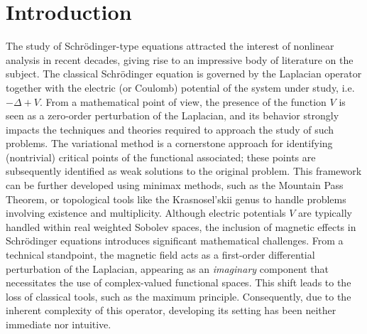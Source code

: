 \documentclass[leqno,11pt]{amsart}
\numberwithin{equation}{section}
\begin{document}
\section{Introduction}
The study of Schr\"odinger-type equations attracted the interest of nonlinear analysis in recent decades, giving rise to an impressive body of literature on the subject. The classical Schr\"odinger equation is governed by the Laplacian operator together with the electric (or Coulomb) potential of the system under study, i.e. $-\Delta + V$. From a mathematical point of view, the presence of the function $V$ is seen as a zero-order perturbation of the Laplacian, and its behavior strongly impacts the techniques and theories required to approach the study of such problems. The variational method is a cornerstone approach for identifying (nontrivial) critical points of the functional associated; these points are subsequently identified as weak solutions to the original problem. This framework can be further developed using minimax methods, such as the Mountain Pass Theorem, or topological tools like the Krasnosel’skii genus to handle problems involving existence and multiplicity. 
Although electric potentials $V$ are typically handled within real weighted Sobolev spaces, the inclusion of magnetic effects in Schr\"odinger equations introduces significant mathematical challenges. From a technical standpoint, the magnetic field acts as a first-order differential perturbation of the Laplacian, appearing as an \textit{imaginary} component that necessitates the use of complex-valued functional spaces. This shift leads to the loss of classical tools, such as the maximum principle. Consequently, due to the inherent complexity of this operator, developing its setting has been neither immediate nor intuitive.
\end{document}
